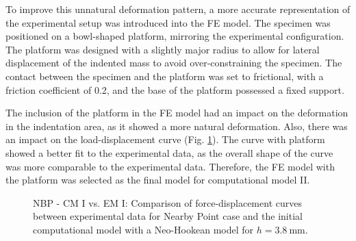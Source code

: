 To improve this unnatural deformation pattern, a more accurate representation of the 
experimental setup was introduced into the FE model. The specimen was positioned on a bowl-shaped
platform, mirroring the experimental configuration. The platform was designed with a slightly major radius to allow 
for lateral displacement of the indented mass to avoid over-constraining the specimen. The contact 
between the specimen and the platform was set to frictional, with a friction coefficient of 0.2, and the base of the platform 
possessed a fixed support.

The inclusion of the platform in the FE model had an impact on the deformation in the indentation area, 
as it showed a more natural deformation. Also, there was an impact on the load-displacement curve (Fig. \ref{fig:noplatformvsplatform}). 
The curve with platform showed a better fit to the experimental data, as the overall shape of the curve was more 
comparable to the experimental data. Therefore, the FE model with the platform was selected as the final model for computational 
model II.\\
\begin{figure}%
    \centering
   \quad
   \caption[CP II: No platform vs. with platform]{NBP - CM I vs. EM I: Comparison of force-displacement curves between experimental data for Nearby Point case and the initial computational model with a Neo-Hookean model for $h = \SI{3.8}{\milli \meter}$.}%
   \label{fig:noplatformvsplatform}%
\end{figure}


